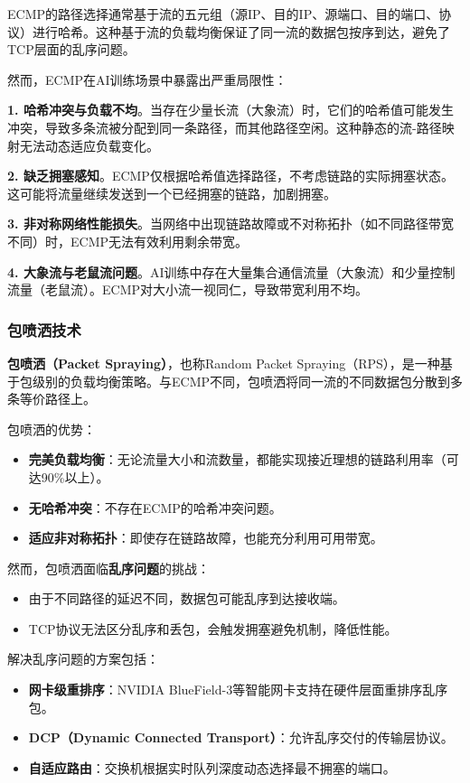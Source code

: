 ECMP的路径选择通常基于流的五元组（源IP、目的IP、源端口、目的端口、协议）进行哈希。这种基于流的负载均衡保证了同一流的数据包按序到达，避免了TCP层面的乱序问题。

然而，ECMP在AI训练场景中暴露出严重局限性：

\textbf{1. 哈希冲突与负载不均}。当存在少量长流（大象流）时，它们的哈希值可能发生冲突，导致多条流被分配到同一条路径，而其他路径空闲。这种静态的流-路径映射无法动态适应负载变化。

\textbf{2. 缺乏拥塞感知}。ECMP仅根据哈希值选择路径，不考虑链路的实际拥塞状态。这可能将流量继续发送到一个已经拥塞的链路，加剧拥塞。

\textbf{3. 非对称网络性能损失}。当网络中出现链路故障或不对称拓扑（如不同路径带宽不同）时，ECMP无法有效利用剩余带宽。

\textbf{4. 大象流与老鼠流问题}。AI训练中存在大量集合通信流量（大象流）和少量控制流量（老鼠流）。ECMP对大小流一视同仁，导致带宽利用不均。

\subsubsection{包喷洒技术}

\textbf{包喷洒（Packet Spraying）}，也称Random Packet Spraying（RPS），是一种基于包级别的负载均衡策略。与ECMP不同，包喷洒将同一流的不同数据包分散到多条等价路径上。

包喷洒的优势：
\begin{itemize}
    \item \textbf{完美负载均衡}：无论流量大小和流数量，都能实现接近理想的链路利用率（可达90\%以上）。
    \item \textbf{无哈希冲突}：不存在ECMP的哈希冲突问题。
    \item \textbf{适应非对称拓扑}：即使存在链路故障，也能充分利用可用带宽。
\end{itemize}

然而，包喷洒面临\textbf{乱序问题}的挑战：
\begin{itemize}
    \item 由于不同路径的延迟不同，数据包可能乱序到达接收端。
    \item TCP协议无法区分乱序和丢包，会触发拥塞避免机制，降低性能。
\end{itemize}

解决乱序问题的方案包括：
\begin{itemize}
    \item \textbf{网卡级重排序}：NVIDIA BlueField-3等智能网卡支持在硬件层面重排序乱序包。
    \item \textbf{DCP（Dynamic Connected Transport）}：允许乱序交付的传输层协议。
    \item \textbf{自适应路由}：交换机根据实时队列深度动态选择最不拥塞的端口。
\end{itemize}

